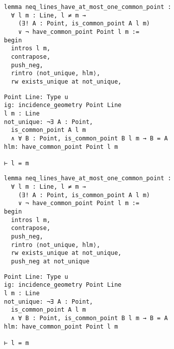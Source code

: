\begin{frame}[fragile]
	\begin{multicols}{2}
		\begin{lstlisting}
lemma neq_lines_have_at_most_one_common_point :
  ∀ l m : Line, l ≠ m → 
    (∃! A : Point, is_common_point A l m) 
    ∨ ¬ have_common_point Point l m := 
begin
  intros l m,
  contrapose,
  push_neg,
  rintro ⟨not_unique, hlm⟩,
  rw exists_unique at not_unique,
\end{lstlisting}
		\columnbreak
		\begin{lstlisting}
Point Line: Type u
ig: incidence_geometry Point Line
l m : Line
not_unique: ¬∃ A : Point, 
  is_common_point A l m 
  ∧ ∀ B : Point, is_common_point B l m → B = A
hlm: have_common_point Point l m

⊢ l = m
		\end{lstlisting}
	\end{multicols}
\end{frame}










\begin{frame}[fragile]
	\begin{multicols}{2}
		\begin{lstlisting}
lemma neq_lines_have_at_most_one_common_point :
  ∀ l m : Line, l ≠ m → 
    (∃! A : Point, is_common_point A l m) 
    ∨ ¬ have_common_point Point l m := 
begin
  intros l m,
  contrapose,
  push_neg,
  rintro ⟨not_unique, hlm⟩,
  rw exists_unique at not_unique,
  push_neg at not_unique
\end{lstlisting}
		\columnbreak
		\begin{lstlisting}
Point Line: Type u
ig: incidence_geometry Point Line
l m : Line
not_unique: ¬∃ A : Point, 
  is_common_point A l m 
  ∧ ∀ B : Point, is_common_point B l m → B = A
hlm: have_common_point Point l m

⊢ l = m
		\end{lstlisting}
	\end{multicols}
\end{frame}










